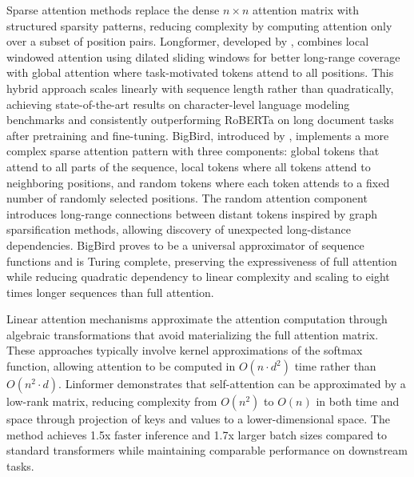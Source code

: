 Sparse attention methods replace the dense $n \times n$ attention matrix with structured sparsity patterns, reducing complexity by computing attention only over a subset of position pairs. Longformer, developed by \citet{beltagy2020longformer}, combines local windowed attention using dilated sliding windows for better long-range coverage with global attention where task-motivated tokens attend to all positions. This hybrid approach scales linearly with sequence length rather than quadratically, achieving state-of-the-art results on character-level language modeling benchmarks and consistently outperforming RoBERTa on long document tasks after pretraining and fine-tuning. BigBird, introduced by \citet{zaheer2020bigbird}, implements a more complex sparse attention pattern with three components: global tokens that attend to all parts of the sequence, local tokens where all tokens attend to neighboring positions, and random tokens where each token attends to a fixed number of randomly selected positions. The random attention component introduces long-range connections between distant tokens inspired by graph sparsification methods, allowing discovery of unexpected long-distance dependencies. BigBird proves to be a universal approximator of sequence functions and is Turing complete, preserving the expressiveness of full attention while reducing quadratic dependency to linear complexity and scaling to eight times longer sequences than full attention.

Linear attention mechanisms approximate the attention computation through algebraic transformations that avoid materializing the full attention matrix. These approaches typically involve kernel approximations of the softmax function, allowing attention to be computed in $O(n \cdot d^2)$ time rather than $O(n^2 \cdot d)$. Linformer demonstrates that self-attention can be approximated by a low-rank matrix, reducing complexity from $O(n^2)$ to $O(n)$ in both time and space through projection of keys and values to a lower-dimensional space. The method achieves 1.5x faster inference and 1.7x larger batch sizes compared to standard transformers while maintaining comparable performance on downstream tasks.

